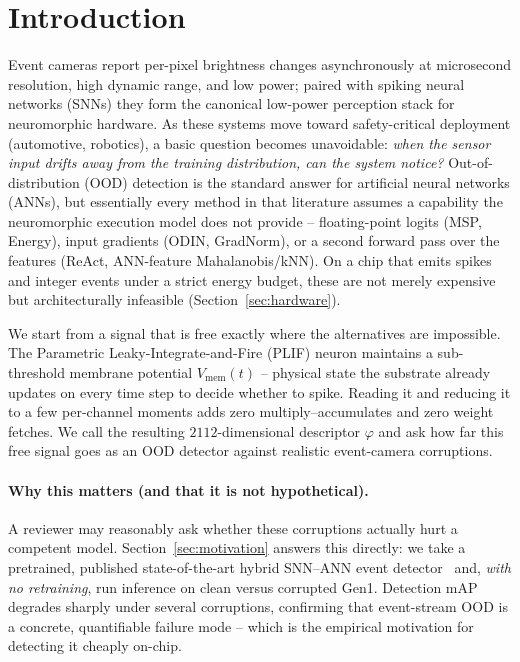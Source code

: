 \section{Introduction}
\label{sec:intro}

Event cameras report per-pixel brightness changes asynchronously at microsecond resolution,
high dynamic range, and low power; paired with spiking neural networks (SNNs) they form the
canonical low-power perception stack for neuromorphic hardware. As these systems move toward
safety-critical deployment (automotive, robotics), a basic question becomes unavoidable:
\emph{when the sensor input drifts away from the training distribution, can the system
notice?} Out-of-distribution (OOD) detection is the standard answer for artificial neural
networks (ANNs), but essentially every method in that literature assumes a capability the
neuromorphic execution model does not provide -- floating-point logits (MSP, Energy),
input gradients (ODIN, GradNorm), or a second forward pass over the features (ReAct,
ANN-feature Mahalanobis/kNN). On a chip that emits spikes and integer events under a strict
energy budget, these are not merely expensive but architecturally infeasible
(Section~\ref{sec:hardware}).

We start from a signal that is free exactly where the alternatives are impossible. The
Parametric Leaky-Integrate-and-Fire (PLIF) neuron maintains a sub-threshold membrane
potential $V_{\mathrm{mem}}(t)$ -- physical state the substrate already updates on every
time step to decide whether to spike. Reading it and reducing it to a few per-channel
moments adds zero multiply--accumulates and zero weight fetches. We call the resulting
$2112$-dimensional descriptor $\varphi$ and ask how far this free signal goes as an OOD
detector against realistic event-camera corruptions.

\paragraph{Why this matters (and that it is not hypothetical).}
A reviewer may reasonably ask whether these corruptions actually hurt a competent model.
Section~\ref{sec:motivation} answers this directly: we take a pretrained, published
state-of-the-art hybrid SNN--ANN event detector~\cite{neftci2025hybrid} and, \emph{with no
retraining}, run inference on clean versus corrupted Gen1. Detection mAP degrades sharply
under several corruptions, confirming that event-stream OOD is a concrete, quantifiable
failure mode -- which is the empirical motivation for detecting it cheaply on-chip.

